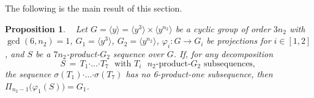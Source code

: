 \documentclass[leqno,a4paper]{amsart}
\def\bd{{\boldsymbol{\cdot}}}
\theoremstyle{plain}
\newtheorem{proposition}[theorem]{Proposition}
\theoremstyle{definition}
\numberwithin{equation}{section}
\begin{document}
	
	\smallskip
	The following is the main result of this section.
	


\smallskip
	\begin{proposition} \label{pro1}~
		Let $G = \langle y\rangle = \langle y^3\rangle \times \langle y^{n_2}\rangle$ be a cyclic group of order $3n_2$ with $\gcd(6,n_2)=1$, $G_1=\langle y^3\rangle$, $G_2= \langle y^{n_2}\rangle$, $\varphi_i \colon G \to G_i$ be projections for $i \in  [1,2]$, and $S$ be a $7n_2$-product-$G_2$ sequence over $G$.
		If, for any decomposition
		\[
		  S \, = \, T_1 \bd \ldots \bd T_7 \,\, \mbox{ with $T_i$ $n_2$-product-$G_2$ subsequences, }
		\]
		the sequence $\sigma(T_1) \bd \ldots \bd \sigma(T_7)$ has no 6-product-one subsequence, then $\Pi_{n_2-1} \big( \varphi_1(S) \big) = G_1$.
	\end{proposition}
	
	
	
\end{document}

